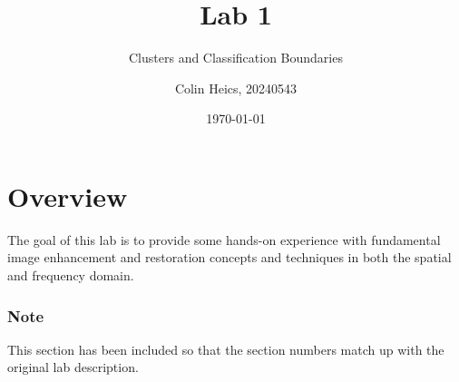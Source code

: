 \documentclass[article, 1.5space, letterpaper, 12pt, oneside, header, footer]{SydeClass}
\title{Lab 1}
\subtitle{Clusters and Classification Boundaries}
\author{Colin Heics, 20240543}
\date{\today}
\begin{document}




\section{Overview}
The goal of this lab is to provide some hands-on experience with fundamental image enhancement and restoration concepts and techniques in both the spatial and frequency domain.

\subsubsection{Note}
This section has been included so that the section numbers match up with the original lab description.















\end{document}
